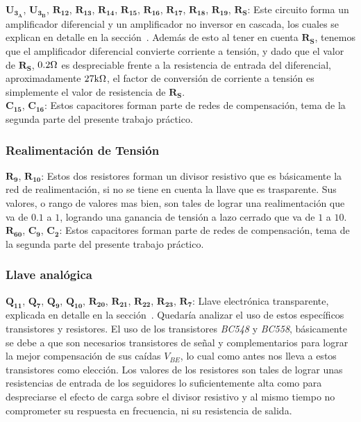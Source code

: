 $\bm{U_{3_{A}}}$, $\bm{U_{3_{B}}}$, $\bm{R_{12}}$, $\bm{R_{13}}$, $\bm{R_{14}}$, $\bm{R_{15}}$, $\bm{R_{16}}$, $\bm{R_{17}}$, $\bm{R_{18}}$, $\bm{R_{19}}$, $\bm{R_{S}}$: Este circuito forma un amplificador diferencial y un amplificador no inversor en cascada, los cuales se explican en detalle en  la sección~. Además de esto al tener en cuenta $\bm{R_{S}}$, tenemos que el amplificador diferencial convierte corriente a tensión, y dado que el valor de $\bm{R_{S}}$, $0.2 \si[per-mode=symbol]{\ohm}$ es despreciable frente a la resistencia de entrada del diferencial, aproximadamente $27 \si[per-mode=symbol]{\kilo\ohm}$, el factor de conversión de corriente a tensión es simplemente el valor de resistencia de $\bm{R_{S}}$.\\

$\bm{C_{15}}$, $\bm{C_{16}}$: Estos capacitores forman parte de redes de compensación, tema de la segunda parte del presente trabajo práctico.\\

\subsubsection{Realimentación de Tensión}

$\bm{R_{9}}$, $\bm{R_{10}}$: Estos dos resistores forman un divisor resistivo que es básicamente la red de realimentación, si no se tiene en cuenta la llave que es trasparente. Sus valores, o rango de valores mas bien, son tales de lograr una realimentación que va de $0.1$ a $1$, logrando una ganancia de tensión a lazo cerrado que va de $1$ a $10$.\\

$\bm{R_{60}}$, $\bm{C_{9}}$, $\bm{C_{2}}$: Estos capacitores forman parte de redes de compensación, tema de la segunda parte del presente trabajo práctico.\\


\subsubsection{Llave analógica}

$\bm{Q_{11}}$, $\bm{Q_{7}}$, $\bm{Q_{9}}$, $\bm{Q_{10}}$, $\bm{R_{20}}$, $\bm{R_{21}}$, $\bm{R_{22}}$, $\bm{R_{23}}$, $\bm{R_{7}}$: Llave electrónica transparente, explicada en detalle en la sección~. Quedaría analizar el uso de estos específicos transistores y resistores. El uso de los transistores \textit{BC548} y \textit{BC558}, básicamente se debe a que son necesarios transistores de señal y complementarios para lograr la mejor compensación de sus caídas $V_{BE}$, lo cual como antes nos lleva a estos transistores como elección. Los valores de los resistores son tales de lograr unas resistencias de entrada de los seguidores lo suficientemente alta como para despreciarse el efecto de carga sobre el divisor resistivo y al mismo tiempo no comprometer su respuesta en frecuencia, ni su resistencia de salida.\\

